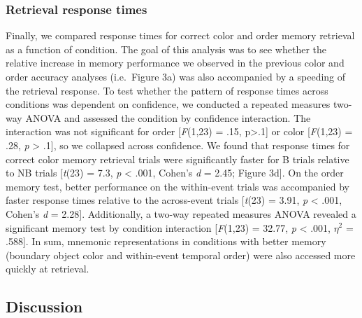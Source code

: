 \subsubsection{Retrieval response times}\label{retrieval-response-times}

Finally, we compared response times for correct color and order memory
retrieval as a function of condition. The goal of this analysis was to
see whether the relative increase in memory performance we observed in
the previous color and order accuracy analyses (i.e.~Figure 3a) was also
accompanied by a speeding of the retrieval response. To test whether the
pattern of response times across conditions was dependent on confidence,
we conducted a repeated measures two-way ANOVA and assessed the
condition by confidence interaction. The interaction was not significant
for order {[}\emph{F}(1,23) = .15, p\textgreater{}.1{]} or color
{[}\emph{F}(1,23) = .28, \emph{p} \textgreater{} .1{]}, so we collapsed
across confidence. We found that response times for correct color memory
retrieval trials were significantly faster for B trials relative to NB
trials {[}\emph{t}(23) = 7.3, \emph{p} \textless{} .001, Cohen's
\emph{d} = 2.45; Figure 3d{]}. On the order memory test, better
performance on the within-event trials was accompanied by faster
response times relative to the across-event trials {[}\emph{t}(23) =
3.91, \emph{p} \textless{} .001, Cohen's \emph{d} = 2.28{]}.
Additionally, a two-way repeated measures ANOVA revealed a significant
memory test by condition interaction {[}\emph{F}(1,23) = 32.77, \emph{p}
\textless{} .001, \(\eta^{2}\) = .588{]}. In sum, mnemonic
representations in conditions with better memory (boundary object color
and within-event temporal order) were also accessed more quickly at
retrieval.

\subsection{Discussion}\label{discussion-1}

